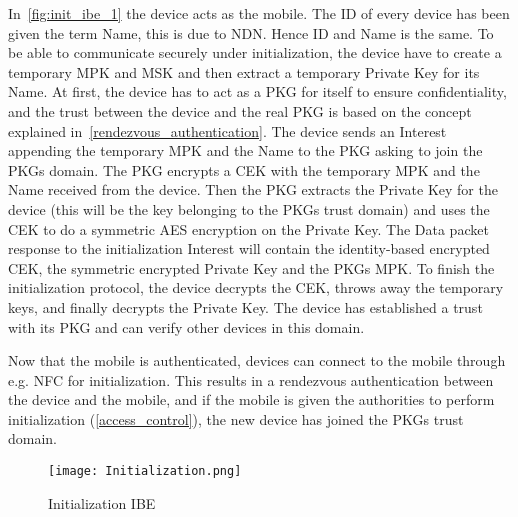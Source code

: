In~\autoref{fig:init_ibe_1} the device acts as the mobile. 
The \gls{ID} of every device has been given the term Name, this is due to \gls{NDN}. 
Hence \gls{ID} and Name is the same.
To be able to communicate securely under initialization, the device have to create a temporary \gls{MPK} and \gls{MSK} and then extract a temporary Private Key for its Name. 
At first, the device has to act as a \gls{PKG} for itself to ensure confidentiality, and the trust between the device and the real \gls{PKG} is based on the concept explained in~\autoref{rendezvous_authentication}.
The device sends an Interest appending the temporary \gls{MPK} and the Name to the \gls{PKG} asking to join the \gls{PKG}s domain.
The \gls{PKG} encrypts a \gls{CEK} with the temporary \gls{MPK} and the Name received from the device. 
Then the \gls{PKG} extracts the Private Key for the device (this will be the key belonging to the \gls{PKG}s trust domain) and uses the \gls{CEK} to do a symmetric \gls{AES} encryption on the Private Key. 
The Data packet response to the initialization Interest will contain the identity-based encrypted \gls{CEK}, the symmetric encrypted Private Key and the \gls{PKG}s \gls{MPK}.
To finish the initialization protocol, the device decrypts the \gls{CEK}, throws away the temporary keys, and finally decrypts the Private Key.
The device has established a trust with its \gls{PKG} and can verify other devices in this domain. 

Now that the mobile is authenticated, devices can connect to the mobile through e.g. \gls{NFC} for initialization.
This results in a rendezvous authentication between the device and the mobile, and if the mobile is given the authorities to perform initialization (\autoref{access_control}), the new device has joined the \gls{PKG}s trust domain.

\begin{figure}[ht]
  \centering
  \texttt{[image: Initialization.png]}
  \caption{Initialization IBE}
  \label{fig:init_ibe_1}
\end{figure}





